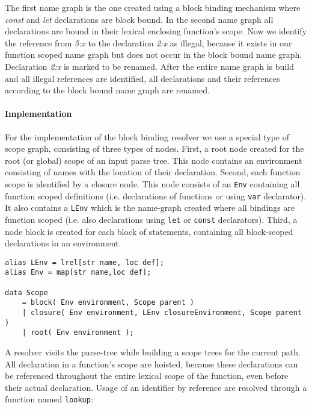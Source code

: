 The first name graph is the one created using a block binding mechanism where \textit{const} and \textit{let} declarations are block bound. In the second name graph all declarations are bound in their lexical enclosing function's scope. Now we identify the reference from \textit{5:x} to the declaration \textit{2:x} as illegal, because it exists in our function scoped name graph but does not occur in the block bound name graph. Declaration \textit{2:x} is marked to be renamed. After the entire name graph is build and all illegal references are identified, all declarations and their references according to the block bound name graph are renamed.

\paragraph{Implementation}
For the implementation of the block binding resolver we use a special type of scope graph, consisting of three types of nodes. First, a root node created for the root (or global) scope of an input parse tree. This node contains an environment consisting of names with the location of their declaration. Second, each function scope is identified by a closure node. This node consists of an \lstinline$Env$ containing all function scoped definitions (i.e. declarations of functions or using \lstinline$var$ declarator). It also contains a \lstinline$LEnv$ which is the name-graph created where all bindings are function scoped (i.e. also declarations using \lstinline$let$ or \lstinline$const$ declarators). Third, a node block is created for each block of statements, containing all block-scoped declarations in an environment.

\begin{lstlisting}[caption=Data structure for scope graph,language=rascal]
alias LEnv = lrel[str name, loc def];
alias Env = map[str name,loc def];

data Scope 
	= block( Env environment, Scope parent )
	| closure( Env environment, LEnv closureEnvironment, Scope parent )
	| root( Env environment );
\end{lstlisting}

A resolver visits the parse-tree while building a scope trees for the current path. All declaration in a function's scope are hoisted, because these declarations can be referenced throughout the entire lexical scope of the function, even before their actual declaration. Usage of an identifier by reference are resolved through a function named \lstinline$lookup$:

